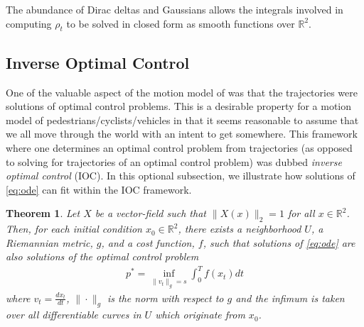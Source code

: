 \documentclass[conference]{IEEEtran}
\newtheorem{thm}{Theorem}
\begin{document}

The abundance of Dirac deltas and Gaussians allows the integrals involved in computing $\rho_t$ to be solved in closed form
as smooth functions over $\mathbb{R}^2$.

\subsection{Inverse Optimal Control}

One of the valuable aspect of the motion model of \cite{Kitani2012} was that the trajectories were solutions of optimal control problems.
This is a desirable property for a motion model of pedestrians/cyclists/vehicles in that it seems reasonable to assume that we all move through the world with an intent to get somewhere.
This framework where one determines an optimal control problem from trajectories (as opposed to solving for trajectories of an optimal control problem) was dubbed \emph{inverse optimal control} (IOC).
In this optional subsection, we illustrate how solutions of \ref{eq:ode} can fit within the IOC framework.

\begin{thm}
	Let $X$ be a vector-field such that $\| X(x) \|_2 = 1$ for all $x \in \mathbb{R}^2$.
Then, for each initial condition $x_0 \in \mathbb{R}^2$, there exists a neighborhood $U$, a Riemannian metric, $g$, and a cost function, $f$, 
such that solutions of \eqref{eq:ode} are also solutions of the optimal control problem
\begin{align}
	p^* = \inf_{ \| v_t \|_g = s } \int_0^T f( x_t) dt \label{eq:IOC}
\end{align}
where $v_t = \frac{d x_t}{dt}$, $\| \cdot \|_g$ is the norm with respect to $g$ and the infimum is taken over all differentiable curves in $U$ which originate from $x_0$.
\end{thm}
\end{document}
